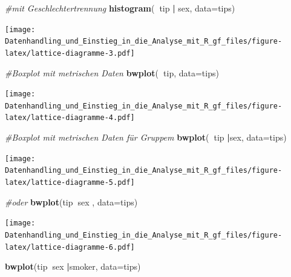 \documentclass[10pt,ngerman,onside]{article}
\newenvironment{Shaded}{\begin{snugshade}}{\end{snugshade}}
\newcommand{\KeywordTok}[1]{\textcolor[rgb]{0.13,0.29,0.53}{\textbf{#1}}}
\newcommand{\DataTypeTok}[1]{\textcolor[rgb]{0.13,0.29,0.53}{#1}}
\newcommand{\StringTok}[1]{\textcolor[rgb]{0.31,0.60,0.02}{#1}}
\newcommand{\CommentTok}[1]{\textcolor[rgb]{0.56,0.35,0.01}{\textit{#1}}}
\newcommand{\OperatorTok}[1]{\textcolor[rgb]{0.81,0.36,0.00}{\textbf{#1}}}
\newcommand{\NormalTok}[1]{#1}
\begin{document}
\begin{Shaded}
\begin{Highlighting}[]
\CommentTok{#mit Geschlechtertrennung}
\KeywordTok{histogram}\NormalTok{(}\OperatorTok{~}\NormalTok{tip }\OperatorTok{|}\StringTok{ }\NormalTok{sex, }\DataTypeTok{data=}\NormalTok{tips)}
\end{Highlighting}
\end{Shaded}

\texttt{[image: Datenhandling\_und\_Einstieg\_in\_die\_Analyse\_mit\_R\_gf\_files/figure-latex/lattice-diagramme-3.pdf]}

\begin{Shaded}
\begin{Highlighting}[]
\CommentTok{#Boxplot mit metrischen Daten}
\KeywordTok{bwplot}\NormalTok{(}\OperatorTok{~}\NormalTok{tip, }\DataTypeTok{data=}\NormalTok{tips)}
\end{Highlighting}
\end{Shaded}

\texttt{[image: Datenhandling\_und\_Einstieg\_in\_die\_Analyse\_mit\_R\_gf\_files/figure-latex/lattice-diagramme-4.pdf]}

\begin{Shaded}
\begin{Highlighting}[]
\CommentTok{#Boxplot mit metrischen Daten für Gruppem}
\KeywordTok{bwplot}\NormalTok{(}\OperatorTok{~}\NormalTok{tip }\OperatorTok{|}\NormalTok{sex, }\DataTypeTok{data=}\NormalTok{tips)}
\end{Highlighting}
\end{Shaded}

\texttt{[image: Datenhandling\_und\_Einstieg\_in\_die\_Analyse\_mit\_R\_gf\_files/figure-latex/lattice-diagramme-5.pdf]}

\begin{Shaded}
\begin{Highlighting}[]
\CommentTok{#oder}
\KeywordTok{bwplot}\NormalTok{(tip}\OperatorTok{~}\NormalTok{sex , }\DataTypeTok{data=}\NormalTok{tips)}
\end{Highlighting}
\end{Shaded}

\texttt{[image: Datenhandling\_und\_Einstieg\_in\_die\_Analyse\_mit\_R\_gf\_files/figure-latex/lattice-diagramme-6.pdf]}

\begin{Shaded}
\begin{Highlighting}[]
\KeywordTok{bwplot}\NormalTok{(tip}\OperatorTok{~}\NormalTok{sex }\OperatorTok{|}\NormalTok{smoker, }\DataTypeTok{data=}\NormalTok{tips)}
\end{Highlighting}
\end{Shaded}
\end{document}
